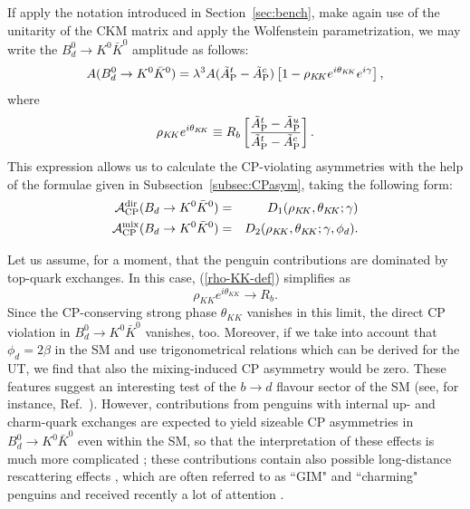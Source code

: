 \documentclass[12pt]{article}
\begin{document}
If apply the notation 
introduced in Section~\ref{sec:bench}, make again use of the
unitarity of the CKM matrix and apply the Wolfenstein parametrization, 
we may write the $B^0_d\to K^0\bar K^0$ amplitude as follows:
\begin{equation}\label{ampl-BdKK-lamt}
A(B^0_d\to K^0\bar K^0)=\lambda^3A(\tilde A_{\rm P}^t-\tilde A_{\rm P}^c)
\left[1-\rho_{K\!K} e^{i\theta_{K\!K}}e^{i\gamma}\right],
\end{equation}
where 
\begin{equation}\label{rho-KK-def}
\rho_{K\!K} e^{i\theta_{K\!K}}\equiv R_b
\left[\frac{\tilde A_{\rm P}^t-\tilde A_{\rm P}^u}{\tilde A_{\rm P}^t-\tilde A_{\rm P}^c}\right].
\end{equation}
This expression allows us to calculate the CP-violating asymmetries with 
the help of the formulae given in Subsection~\ref{subsec:CPasym},
taking the following form:
\begin{eqnarray}
{\cal A}_{\rm CP}^{\rm dir}(B_d\to K^0\bar K^0)&=&
D_1(\rho_{K\!K},\theta_{K\!K};\gamma) \label{CP-BKK-dir-gen}\\
{\cal A}_{\rm CP}^{\rm mix}(B_d\to K^0\bar K^0)&=&
D_2(\rho_{K\!K},\theta_{K\!K};\gamma,\phi_d).\label{CP-BKK-mix-gen}
\end{eqnarray}

Let us assume, for a moment, that the penguin contributions are dominated 
by top-quark exchanges. In this case, (\ref{rho-KK-def}) simplifies as
\begin{equation}
\rho_{K\!K} e^{i\theta_{K\!K}} \to R_b.
\end{equation}
Since the CP-conserving strong phase $\theta_{K\!K}$ vanishes in this limit,
the direct CP violation in $B^0_d\to K^0\bar K^0$ vanishes, too. Moreover, 
if we take into account that $\phi_d=2\beta$ in the SM and use trigonometrical
relations which can be derived for the UT, we find that also the mixing-induced
CP asymmetry would be zero. These features suggest an interesting test
of the $b\to d$ flavour sector of the SM (see, for instance, Ref.\  \cite{quinn}). 
However, contributions from penguins with internal up- and charm-quark 
exchanges are expected to yield sizeable CP asymmetries in 
$B_d^0\to K^0\bar K^0$ even within the SM, so that the interpretation of these 
effects is much more complicated \cite{RF-BdKK}; these contributions 
contain also possible long-distance rescattering effects \cite{BFM},
which are often referred to as ``GIM" and ``charming" penguins and received
recently a lot of attention \cite{charming}.
\end{document}
